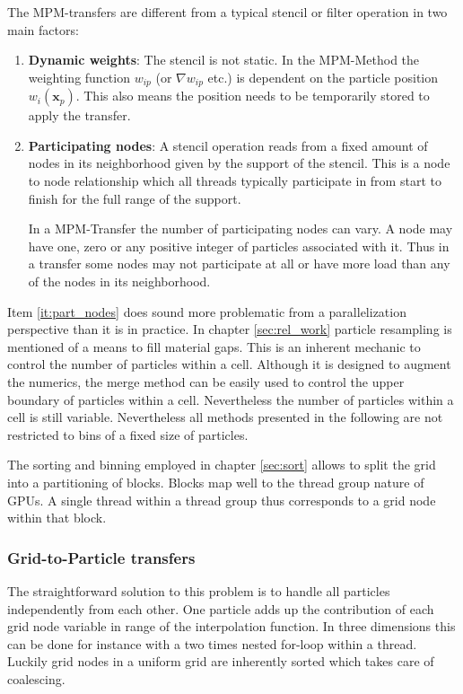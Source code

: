 \documentclass[m,times]{cgMA}
\begin{document}
The MPM-transfers are different from a typical stencil or filter operation in two main factors:
\begin{enumerate}
  \item \textbf{Dynamic weights}: The stencil is not static. In the MPM-Method the weighting function $w_{ip}$ (or $\nabla w_{ip}$ etc.) is dependent on the particle position $w_i(\boldsymbol{x}_p)$. This also means the position needs to be temporarily stored to apply the transfer.
  \item \label{it:part_nodes} \textbf{Participating nodes}: A stencil operation reads from a fixed amount of nodes in its neighborhood given by the support of the stencil. This is a node to node relationship which all threads typically participate in from start to finish for the full range of the support.

In a MPM-Transfer the number of participating nodes can vary. A node may have one, zero or any positive integer of particles associated with it. Thus in a transfer some nodes may not participate at all or have more load than any of the nodes in its neighborhood.
\end{enumerate}
Item \ref{it:part_nodes} does sound more problematic from a parallelization perspective than it is in practice. In chapter \ref{sec:rel_work} particle resampling is mentioned of a means to fill material gaps. This is an inherent mechanic to control the number of particles within a cell. Although it is designed to augment the numerics, the merge method can be easily used to control the upper boundary of particles within a cell. Nevertheless the number of particles within a cell is still variable. Nevertheless all methods presented in the following are not restricted to bins of a fixed size of particles.

The sorting and binning employed in chapter \ref{sec:sort} allows to split the grid into a partitioning of blocks. Blocks map well to the thread group nature of GPUs. A single thread within a thread group thus corresponds to a grid node within that block.
\subsubsection{Grid-to-Particle transfers}\label{sec:g2p}
The straightforward solution to this problem is to handle all particles independently from each other. One particle adds up the contribution of each grid node variable in range of the interpolation function. In three dimensions this can be done for instance with a two times nested for-loop within a thread. Luckily grid nodes in a uniform grid are inherently sorted which takes care of coalescing.
\end{document}
